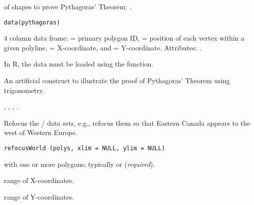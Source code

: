 \documentclass[letterpaper]{book}
\begin{document}
%
\begin{Description}\relax
{} of shapes to prove Pythagoras' Theorem:
.
\end{Description}
%
\begin{Usage}
\begin{verbatim}
data(pythagoras)
\end{verbatim}
\end{Usage}
%
\begin{Format}
4 column data frame:  = primary polygon ID,
 = position of each vertex within a given polyline, 
= X-coordinate, and  = Y-coordinate. Attributes:
.
\end{Format}
%
\begin{Note}\relax
In R, the data must be loaded using the  function.
\end{Note}
%
\begin{Source}\relax
An artificial construct to illustrate the proof of Pythagoras' Theorem
using trigonometry.
\end{Source}
%
\begin{SeeAlso}\relax
{},
,
,
.
\end{SeeAlso}
%
\begin{Description}\relax
Refocus the / data sets, e.g., refocus
them so that Eastern Canada appears to the west of Western Europe.
\end{Description}
%
\begin{Usage}
\begin{verbatim}
refocusWorld (polys, xlim = NULL, ylim = NULL)
\end{verbatim}
\end{Usage}
%
\begin{Arguments}
\begin{ldescription}
\item[\code{polys}]  with one or more polygons; typically
 or  (\emph{required}).
\item[\code{xlim}] range of X-coordinates.
\item[\code{ylim}] range of Y-coordinates.
\end{ldescription}
\end{Arguments}
\end{document}
